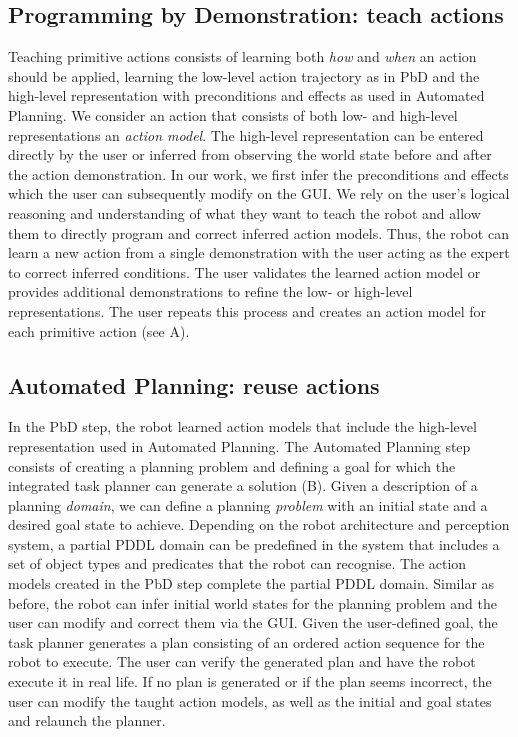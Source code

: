 \subsection{Programming by Demonstration: teach actions}
Teaching primitive actions consists of learning both \textit{how} and \textit{when} an action should be applied, \ie learning the low-level action trajectory as in PbD and the high-level representation with preconditions and effects as used in Automated Planning.
We consider an action that consists of both low- and high-level representations an \textit{action model}.
The high-level representation can be entered directly by the user or inferred from observing the world state before and after the action demonstration.
In our work, we first infer the preconditions and effects which the user can subsequently modify on the GUI.
We rely on the user's logical reasoning and understanding of what they want to teach the robot and allow them to directly program and correct inferred action models.
Thus, the robot can learn a new action from a single demonstration with the user acting as the expert to correct inferred conditions.
The user validates the learned action model or provides additional demonstrations to refine the low- or high-level representations.
The user repeats this process and creates an action model for each primitive action (see A).

\subsection{Automated Planning: reuse actions}\label{sec:AP}
In the PbD step, the robot learned action models that include the high-level representation used in Automated Planning. 
The Automated Planning step consists of creating a planning problem and defining a goal for which the integrated task planner can generate a solution (B).
Given a description of a planning \textit{domain}, we can define a planning \textit{problem} with an initial state and a desired goal state to achieve. 
Depending on the robot architecture and perception system, a partial PDDL domain can be predefined in the system that includes a set of object types and predicates that the robot can recognise.
The action models created in the PbD step complete the partial PDDL domain.
Similar as before, the robot can infer initial world states for the planning problem and the user can modify and correct them via the GUI.
Given the user-defined goal, the task planner generates a plan consisting of an ordered action sequence for the robot to execute. 
The user can verify the generated plan and have the robot execute it in real life.
If no plan is generated or if the plan seems incorrect, the user can modify the taught action models, as well as the initial and goal states and relaunch the planner.


